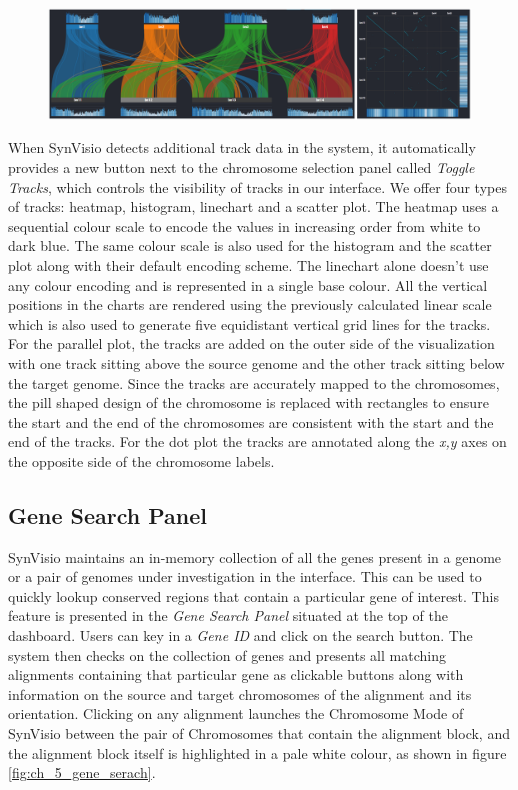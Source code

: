 \begin{figure}
  \centering
  \includegraphics[width=1\linewidth]{images/ch_5_tracks.PNG}
  \label{fig:ch_5_tracks}
\end{figure}
When SynVisio detects additional track data in the system, it automatically provides a new button next to the chromosome selection panel called \textit{Toggle Tracks}, which controls
the visibility of tracks in our interface. We offer four types of tracks: heatmap, histogram, linechart and a scatter plot. The heatmap uses a sequential colour scale to encode the values in increasing order from white to dark blue. The same colour scale is also used for the histogram and the scatter plot along with their default encoding scheme. The linechart alone doesn't use any colour encoding and is represented in a single base colour. All the vertical positions in the charts are rendered using the previously calculated linear scale which is also used to generate five equidistant vertical grid lines for the tracks. For the parallel plot, the tracks are added on the outer side of the visualization with one track sitting above the source genome and the other track sitting below the target genome. Since the tracks are accurately mapped to the chromosomes, the pill shaped design of the chromosome is replaced with rectangles to ensure the start and the end of the chromosomes are consistent with the start and the end of the tracks. For the dot plot the tracks are annotated along the \textit{x,y} axes on the opposite side of the chromosome labels.


\subsection{Gene Search Panel}
SynVisio maintains an in-memory collection of all the genes present in a genome or a pair of genomes under investigation in the interface. This can be used to quickly lookup conserved regions that contain a particular gene of interest. This feature is presented in the \textit{Gene Search Panel} situated at the top of the dashboard. Users can key in a \textit{Gene ID} and click on the search button. The system then checks on the collection of genes and presents all matching alignments containing that particular gene as clickable buttons along with information on the source and target chromosomes of the alignment and its orientation. Clicking on any alignment launches the Chromosome Mode of SynVisio between the pair of Chromosomes that contain the alignment block, and the alignment block itself is highlighted in a pale white colour, as shown in figure \ref{fig:ch_5_gene_serach}. 

